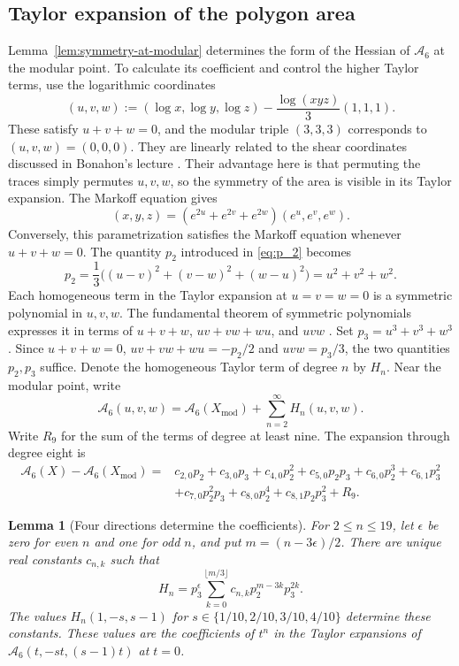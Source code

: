 \documentclass[10pt,twoside]{article}
\theoremstyle{plain}
\newtheorem{lemma}[theorem]{Lemma}
\theoremstyle{definition}
\theoremstyle{remark}
\newcommand{\A}{\mathcal A}
\newcommand{\Xmod}{X_{\mathrm{mod}}}
\begin{document}
\subsection{Taylor expansion of the polygon area}
\label{sec:taylor-expansion}

Lemma~\ref{lem:symmetry-at-modular} determines the form of the
Hessian of $\A_6$ at the modular point. To calculate its coefficient
and control the higher Taylor terms, use the logarithmic coordinates
$$
(u,v,w):=(\log x,\log y,\log z)-\frac{\log(xyz)}3(1,1,1).
$$
These satisfy $u+v+w=0$, and the modular triple $(3,3,3)$
corresponds to $(u,v,w)=(0,0,0)$.
They are linearly related to the shear coordinates discussed in
Bonahon's lecture \cite{Bonahon2018}. Their advantage here is that
permuting the traces simply permutes $u,v,w$, so the symmetry of
the area is visible in its Taylor expansion.
The Markoff equation gives
\begin{equation}
\label{eq:shape-trace-parametrization}
(x,y,z)=(e^{2u}+e^{2v}+e^{2w})(e^u,e^v,e^w).
\end{equation}
Conversely, this parametrization satisfies the Markoff equation
whenever $u+v+w=0$. The quantity $p_2$ introduced in \eqref{eq:p_2} becomes
$$
p_2=\frac13\bigl((u-v)^2+(v-w)^2+(w-u)^2\bigr)
=u^2+v^2+w^2.
$$
Each homogeneous term in the Taylor expansion at $u=v=w=0$
is a symmetric polynomial in $u,v,w$. The fundamental theorem of
symmetric polynomials expresses it in terms of
$u+v+w$, $uv+vw+wu$, and $uvw$
\cite[p.~21, Remark following (2.4)]{Macdonald}.
Set $p_3=u^3+v^3+w^3$. Since $u+v+w=0$,
$uv+vw+wu=-p_2/2$ and $uvw=p_3/3$, the two quantities $p_2,p_3$
suffice. Denote the homogeneous Taylor term of degree $n$ by $H_n$.
Near the modular point, write
\begin{equation}
\label{eq:homogeneous-area-expansion}
\A_6(u,v,w)=\A_6(\Xmod)+\sum_{n=2}^{\infty}H_n(u,v,w).
\end{equation}
Write $R_9$ for the sum of the terms of degree at least nine.
The expansion through degree eight is
\begin{equation}
\label{eq:degree-eight-expansion}
\begin{aligned}
\A_6(X)-\A_6(\Xmod)
={}&c_{2,0}p_2+c_{3,0}p_3+c_{4,0}p_2^2+c_{5,0}p_2p_3
+c_{6,0}p_2^3+c_{6,1}p_3^2\\
&+c_{7,0}p_2^2p_3+c_{8,0}p_2^4+c_{8,1}p_2p_3^2+R_9.
\end{aligned}
\end{equation}
\begin{lemma}[Four directions determine the coefficients]
\label{lem:four-directions}
For $2\leq n\leq19$, let $\epsilon$ be zero for even $n$ and one for
odd $n$, and put $m=(n-3\epsilon)/2$. There are unique real constants
$c_{n,k}$ such that
\begin{equation}
\label{eq:invariant-homogeneous-form}
H_n=p_3^\epsilon\sum_{k=0}^{\lfloor m/3\rfloor}
c_{n,k}p_2^{m-3k}p_3^{2k}.
\end{equation}
The values $H_n(1,-s,s-1)$ for
$s\in\{1/10,2/10,3/10,4/10\}$ determine these constants.
These values are the coefficients of $t^n$ in the Taylor expansions of
$\A_6(t,-st,(s-1)t)$ at $t=0$.
\end{lemma}
\end{document}
